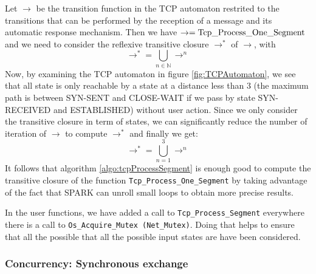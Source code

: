 \documentclass[a4paper, 10pt]{article}
\begin{document}
    Let $\rightarrow$ be the transition function in the TCP automaton restrited to the transitions
    that can be performed by the reception of a message and its automatic response mechanism.
    Then we have $\rightarrow = \text{\lstinline[language=Ada]{Tcp_Process_One_Segment}}$ and
    we need to consider the reflexive transitive closure $\rightarrow^*$ of $\rightarrow$, with
    \[\rightarrow^* = \bigcup_{n\in\mathbb{N}} \rightarrow^n\]
    Now, by examining the TCP automaton in figure \ref{fig:TCPAutomaton}, we see that all state is
    only reachable by a state at a distance less than 3 (the maximum path is between SYN-SENT and
    CLOSE-WAIT if we pass by state SYN-RECEIVED and ESTABLISHED) without user action. Since
    we only consider the transitive closure in term of states, we can significantly reduce the number
    of iteration of $\rightarrow$ to compute $\rightarrow^*$ and finally we get:
    \[\rightarrow^* = \bigcup_{n=1}^3 \rightarrow^n\]
    It follows that algorithm \ref{algo:tcpProcessSegment} is enough good to compute the transitive closure of the function
    \lstinline[language=Ada]{Tcp_Process_One_Segment} by taking advantage of the fact that SPARK can unroll
    small loops to obtain more precise results.

    \begin{algorithm}[t]
        \caption{Reflexive and transitive closure of \lstinline[language=Ada]{Tcp_Process_One_Segment}}
        \label{algo:tcpProcessSegment}
    \end{algorithm}

    In the user functions, we have added a call to \lstinline[language=Ada]{Tcp_Process_Segment} everywhere
    there is a call to \lstinline{Os_Acquire_Mutex (Net_Mutex)}. Doing that helps to ensure that all the
    possible that all the possible input states are have been considered.

    \subsubsection{Concurrency: Synchronous exchange}
    \label{section:synchronous}
\end{document}
